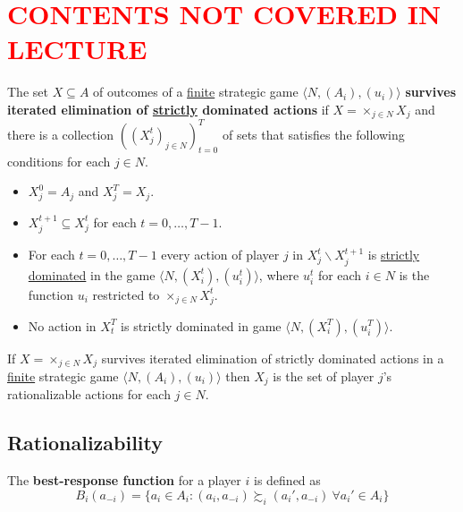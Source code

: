 \documentclass[11pt]{article}
\newcommand{\red}[1]{\textcolor{red}{#1}}
\begin{document}
	\newpage
	\section*{\red{CONTENTS NOT COVERED IN LECTURE}}
	\begin{definition}[60.2]
				The set $X \subseteq A$ of outcomes of a \ul{finite} strategic game $\langle N, (A_i), (u_i) \rangle$ \textbf{survives iterated elimination of \ul{strictly} dominated actions} if $X = \times_{j \in N} X_j$ and there is a collection $((X_j^t)_{j \in N})_{t=0}^T$ of sets that satisfies the following conditions for each $j \in N$.
				\begin{itemize}
					\item $X_j^0 = A_j$ and $X_j^T = X_j$.
					\item $X_j^{t+1} \subseteq X_j^t$ for each $t = 0, \dots, T - 1$.
					\item For each $t = 0, \dots, T-1$ every action of player $j$ in $X_j^t \backslash X_j^{t+1}$ is \ul{strictly dominated} in the game $\langle N, (X_i^t), (u_i^t) \rangle$, where $u_i^t$ for each $i \in N$ is the function $u_i$ restricted to $\times_{j \in N} X_j^t$.
					\item No action in $X_t^T$ is strictly dominated in game $\langle N, (X_i^T), (u_i^T) \rangle$.
				\end{itemize}
			\end{definition}
			
			\begin{proposition}[61.2]
				If $X = \times_{j \in N}X_j$ survives iterated elimination of strictly dominated actions in a \ul{finite} strategic game $\langle N, (A_i), (u_i) \rangle$ then $X_j$ is the set of player $j$'s rationalizable actions for each $j \in N$.
			\end{proposition}
			
		\subsection{Rationalizability}
			\begin{definition}[pg.15]
				The \textbf{best-response function} for a player $i$ is defined as
				\[
					B_i(a_{-i}) = \{a_i \in A_i : (a_i, a_{-i}) \succsim_i (a_i', a_{-i})\ \forall a_i' \in A_i \}
				\]
			\end{definition}
			
\end{document}
